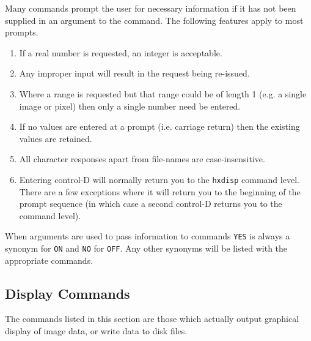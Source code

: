 Many commands prompt the user for necessary information if it has not
been supplied in an argument to the command. The following features
apply to most prompts.
\begin{enumerate}
\item If a real number is requested, an integer is acceptable.
\item Any improper input will result in
the request being re-issued.
\item Where a range is requested but that range could
be of length 1 (e.g. a single image or pixel) then only a single number
need be entered.
\item If no values are entered at a prompt (i.e. carriage return)
then the existing values are retained.
\item All character responses apart from file-names
are case-insensitive.
\item Entering control-D will normally return you to the \verb!hxdisp!
command level. There are a few exceptions where it will return you to
the beginning of the prompt sequence (in which case a second control-D
returns you to the command level).
\end{enumerate}

When arguments are used to pass information to commands {\tt YES} is
always a synonym for {\tt ON} and {\tt NO} for {\tt OFF}. Any other
synonyms will be listed with the appropriate commands.

\subsection{Display Commands}

The commands listed in this section are those which actually output
graphical display of image data, or write data to disk files.

